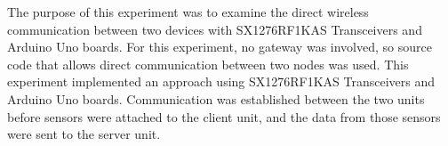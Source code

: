 The purpose of this experiment was to examine the direct wireless communication between two devices with SX1276RF1KAS Transceivers and Arduino Uno boards.
For this experiment, no gateway was involved, so source code that allows direct communication between two nodes was used.
This experiment implemented an approach using SX1276RF1KAS Transceivers and Arduino Uno boards.
Communication was established between the two units before sensors were attached to the client unit, and the data from those sensors were sent to the server unit.
